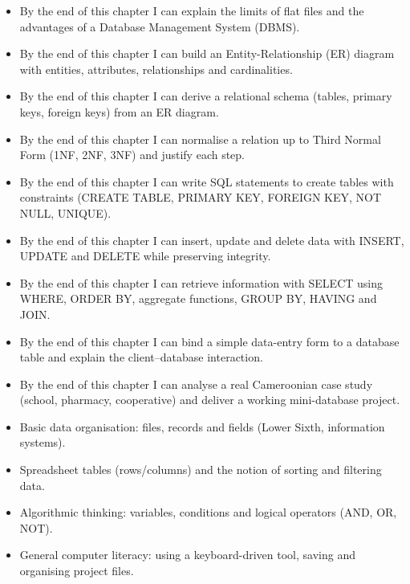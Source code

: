 \documentclass[11pt]{article}
\begin{document}
\begin{objectifs}
\begin{itemize}
\item By the end of this chapter I can explain the limits of flat files and the advantages of a Database Management System (DBMS).
\item By the end of this chapter I can build an Entity-Relationship (ER) diagram with entities, attributes, relationships and cardinalities.
\item By the end of this chapter I can derive a relational schema (tables, primary keys, foreign keys) from an ER diagram.
\item By the end of this chapter I can normalise a relation up to Third Normal Form (1NF, 2NF, 3NF) and justify each step.
\item By the end of this chapter I can write SQL statements to create tables with constraints (CREATE TABLE, PRIMARY KEY, FOREIGN KEY, NOT NULL, UNIQUE).
\item By the end of this chapter I can insert, update and delete data with INSERT, UPDATE and DELETE while preserving integrity.
\item By the end of this chapter I can retrieve information with SELECT using WHERE, ORDER BY, aggregate functions, GROUP BY, HAVING and JOIN.
\item By the end of this chapter I can bind a simple data-entry form to a database table and explain the client–database interaction.
\item By the end of this chapter I can analyse a real Cameroonian case study (school, pharmacy, cooperative) and deliver a working mini-database project.
\end{itemize}
\end{objectifs}

\begin{prerequis}
\begin{itemize}
\item Basic data organisation: files, records and fields (Lower Sixth, information systems).
\item Spreadsheet tables (rows/columns) and the notion of sorting and filtering data.
\item Algorithmic thinking: variables, conditions and logical operators (AND, OR, NOT).
\item General computer literacy: using a keyboard-driven tool, saving and organising project files.
\end{itemize}
\end{prerequis}
\end{document}
